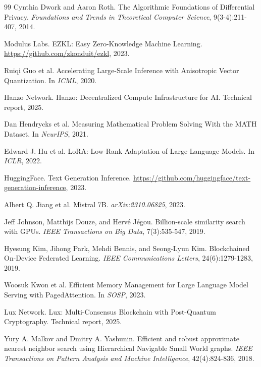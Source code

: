 \begin{thebibliography}{99}
Cynthia Dwork and Aaron Roth.
\newblock The Algorithmic Foundations of Differential Privacy.
\newblock \textit{Foundations and Trends in Theoretical Computer Science}, 9(3-4):211-407, 2014.

Modulus Labs.
\newblock EZKL: Easy Zero-Knowledge Machine Learning.
\newblock \url{https://github.com/zkonduit/ezkl}, 2023.

Ruiqi Guo et al.
\newblock Accelerating Large-Scale Inference with Anisotropic Vector Quantization.
\newblock In \textit{ICML}, 2020.

Hanzo Network.
\newblock Hanzo: Decentralized Compute Infrastructure for AI.
\newblock Technical report, 2025.

Dan Hendrycks et al.
\newblock Measuring Mathematical Problem Solving With the MATH Dataset.
\newblock In \textit{NeurIPS}, 2021.

Edward J. Hu et al.
\newblock LoRA: Low-Rank Adaptation of Large Language Models.
\newblock In \textit{ICLR}, 2022.

HuggingFace.
\newblock Text Generation Inference.
\newblock \url{https://github.com/huggingface/text-generation-inference}, 2023.

Albert Q. Jiang et al.
\newblock Mistral 7B.
\newblock \textit{arXiv:2310.06825}, 2023.

Jeff Johnson, Matthijs Douze, and Hervé Jégou.
\newblock Billion-scale similarity search with GPUs.
\newblock \textit{IEEE Transactions on Big Data}, 7(3):535-547, 2019.

Hyesung Kim, Jihong Park, Mehdi Bennis, and Seong-Lyun Kim.
\newblock Blockchained On-Device Federated Learning.
\newblock \textit{IEEE Communications Letters}, 24(6):1279-1283, 2019.

Woosuk Kwon et al.
\newblock Efficient Memory Management for Large Language Model Serving with PagedAttention.
\newblock In \textit{SOSP}, 2023.

Lux Network.
\newblock Lux: Multi-Consensus Blockchain with Post-Quantum Cryptography.
\newblock Technical report, 2025.

Yury A. Malkov and Dmitry A. Yashunin.
\newblock Efficient and robust approximate nearest neighbor search using Hierarchical Navigable Small World graphs.
\newblock \textit{IEEE Transactions on Pattern Analysis and Machine Intelligence}, 42(4):824-836, 2018.


\end{thebibliography}
